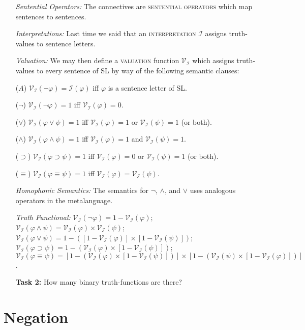 \documentclass[a4paper, 11pt]{article} %
\newcommand{\I}{\mathcal{I}}
\newcommand{\V}[1]{\mathcal{V}_{#1}} %
\begin{document}
\begin{enumerate}[leftmargin=1.5in,labelsep=.15in] %
  \item[\it Sentential Operators:] The connectives are \textsc{sentential operators} which map sentences to sentences.
  \item[\it Interpretations:] Last time we said that an \textsc{interpretation} $\I$ assigns truth-values to sentence letters.
  \item[\it Valuation:] We may then define a \textsc{valuation} function $\V{\I}$ which assigns truth-values to every sentence of SL by way of the following semantic clauses:
    \item[($A$)] $\V{\I}(\neg\varphi)=\I(\varphi)$ iff $\varphi$ is a sentence letter of SL.
    \item[($\neg$)] $\V{\I}(\neg\varphi)=1$ iff $\V{\I}(\varphi)=0$.
    \item[($\vee$)] $\V{\I}(\varphi \vee \psi)=1$ iff $\V{\I}(\varphi)=1$ or $\V{\I}(\psi)=1$ (or both).
    \item[($\wedge$)] $\V{\I}(\varphi \wedge \psi)=1$ iff $\V{\I}(\varphi)=1$ and $\V{\I}(\psi)=1$.
    \item[($\supset$)] $\V{\I}(\varphi \supset \psi)=1$ iff $\V{\I}(\varphi)=0$ or $\V{\I}(\psi)=1$ (or both).
    \item[($\equiv$)] $\V{\I}(\varphi \equiv \psi)=1$ iff $\V{\I}(\varphi)=\V{\I}(\psi)$.
  \item[\it Homophonic Semantics:] The semantics for $\neg$, $\wedge$, and $\vee$ uses analogous operators in the metalanguage. 
  \item[\it Truth Functional:] $\V{\I}(\neg\varphi)=1-\V{\I}(\varphi)$;\\
    $\V{\I}(\varphi\wedge\psi)=\V{\I}(\varphi)\times\V{\I}(\psi)$;\\
    $\V{\I}(\varphi\vee\psi)=1-([1-\V{\I}(\varphi)]\times[1-\V{\I}(\psi)])$;\\
    $\V{\I}(\varphi\supset\psi)=1-(\V{\I}(\varphi)\times[1-\V{\I}(\psi)])$;\\
    \mbox{$\V{\I}(\varphi\equiv\psi)=[1-(\V{\I}(\varphi)\times[1-\V{\I}(\psi)])]\times[1-(\V{\I}(\psi)\times[1-\V{\I}(\varphi)])]$.}
  \item[\bf Task 2:] How many binary truth-functions are there?
\end{enumerate}



\section*{Negation}
\end{document}
